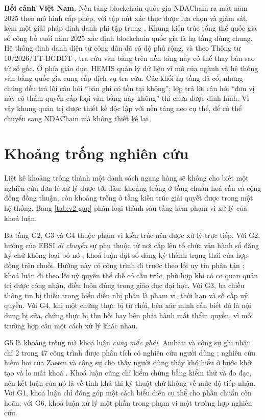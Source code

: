 \textbf{Bối cảnh Việt Nam.} Nền tảng blockchain quốc gia NDAChain ra mắt năm 2025 theo mô hình cấp phép, với tập nút xác thực được lựa chọn và giám sát, kèm một giải pháp định danh phi tập trung \cite{NDAChain2025}. Khung kiến trúc tổng thể quốc gia số công bố cuối năm 2025 xác định blockchain quốc gia là hạ tầng dùng chung. Hệ thống định danh điện tử công dân đã có độ phủ rộng, và theo Thông tư 10/2026/TT-BGDĐT \cite{TT10_2026}, tra cứu văn bằng trên nền tảng này có thể thay bản sao từ sổ gốc. Ở phía giáo dục, HEMIS quản lý dữ liệu vĩ mô của ngành và hệ thống văn bằng quốc gia cung cấp dịch vụ tra cứu. Các khối hạ tầng đã có, nhưng chúng đều trả lời câu hỏi ``bản ghi có tồn tại không''; lớp trả lời câu hỏi ``đơn vị này có thẩm quyền cấp loại văn bằng này không'' thì chưa được định hình. Vì vậy khung quản trị được thiết kế độc lập với nền tảng neo cụ thể, để có thể chuyển sang NDAChain mà không thiết kế lại.



\section{Khoảng trống nghiên cứu}
\label{sec:khoang-trong}

Liệt kê khoảng trống thành một danh sách ngang hàng sẽ không cho biết một nghiên cứu đơn lẻ xử lý được tới đâu: khoảng trống ở tầng chuẩn hoá cần cả cộng đồng đồng thuận, còn khoảng trống ở tầng kiến trúc giải quyết được trong một hệ thống. Bảng \ref{tab:v2-gap} phân loại thành sáu tầng kèm phạm vi xử lý của khoá luận.



Ba tầng G2, G3 và G4 thuộc phạm vi kiến trúc nên được xử lý trực tiếp. Với G2, hướng của EBSI \emph{di chuyển} sự phụ thuộc từ nơi cấp lên tổ chức vận hành sổ đăng ký chứ không loại bỏ nó \cite{SSI_Survey2025}; khoá luận đặt sổ đăng ký thành trạng thái của hợp đồng trên chuỗi. Hướng này có công trình đi trước theo lối uy tín phân tán \cite{Eer2022, DeSalve2023}; khoá luận đi theo lối uỷ quyền thể chế có cấu trúc, phù hợp khi có cơ quan quản trị được công nhận, điều luôn đúng trong giáo dục đại học. Với G3, ba chiều thông tin bị thiếu trong biểu diễn nhị phân là phạm vi, thời hạn và số cấp uỷ quyền. Với G4, khi một chứng thực bị từ chối, bên xác minh cần biết đó là nội dung bị sửa, chứng thực bị thu hồi hay bên phát hành mất thẩm quyền, vì mỗi trường hợp cần một cách xử lý khác nhau.

G5 là khoảng trống mà khoá luận \emph{cũng mắc phải}. Ambati và cộng sự ghi nhận chỉ 2 trong 47 công trình được phân tích có nghiên cứu người dùng \cite{Ambati2026}; nghiên cứu hiếm hoi của Zaeem và cộng sự cho thấy người dùng thấy khó hiểu ở bước khởi tạo và lo mất khoá \cite{Zaeem2021}. Khoá luận cũng chỉ kiểm chứng bằng kiểm thử và đo đạc, nên kết luận của nó là về tính khả thi kỹ thuật chứ không về mức độ tiếp nhận. Với G1, khoá luận chỉ đóng góp một cách biểu diễn cụ thể cho phần chuẩn còn hoãn; với G6, khoá luận xử lý một phần trong phạm vi một trường hợp nghiên cứu.
